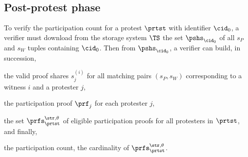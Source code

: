 \normalsize


\subsection{Post-protest phase}%
\label{ProtocolVerification}



To verify the participation count for a protest \(\prtst\) with identifier 
\(\cid_0\), a verifier must download from the storage system \(\TS\) the set 
\(\pshs_{\cid_0}\) of all \(s_P\) and \(s_W\) tuples containing \(\cid_0\).
Then from \(\pshs_{\cid_0}\), a verifier can build, in succession,
\begin{enumerate*}
\item the valid proof shares \(s_j^{(i)}\) for all matching pairs \((s_P, 
    s_W)\) corresponding to a witness \(i\) and a protester \(j\),
\item the participation proof \(\prf_{j}\) for each protester \(j\),
\item the set \(\prfs_{\prtst}^{\str,\theta}\) of eligible participation proofs 
  for all protesters in \(\prtst\), and finally,
\item the participation count, \ie the cardinality of 
  \(\prfs_\prtst^{\str,\theta}\).
\end{enumerate*}

